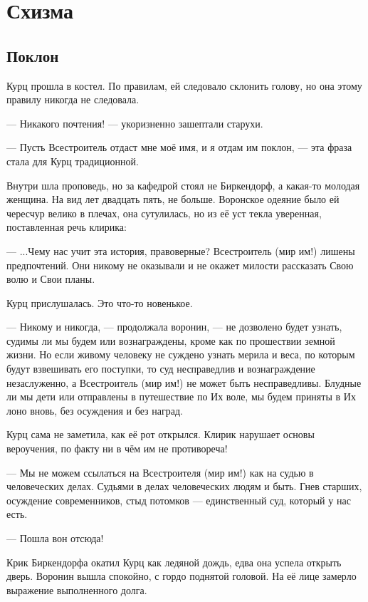 \chapter{Схизма}

\section{Поклон}

Курц прошла в костел.
По правилам, ей следовало склонить голову, но она этому правилу никогда не следовала.

--- Никакого почтения! --- укоризненно зашептали старухи.

--- Пусть Всестроитель отдаст мне моё имя, и я отдам им поклон, --- эта фраза стала для Курц традиционной.

Внутри шла проповедь, но за кафедрой стоял не Биркендорф, а какая-то молодая женщина.
На вид лет двадцать пять, не больше.
Воронское одеяние было ей чересчур велико в плечах, она сутулилась, но из её уст текла уверенная, поставленная речь клирика:

--- ...Чему нас учит эта история, правоверные?
Всестроитель (мир им!) лишены предпочтений.
Они никому не оказывали и не окажет милости рассказать Свою волю и Свои планы.

Курц прислушалась.
Это что-то новенькое.

--- Никому и никогда, --- продолжала воронин, --- не дозволено будет узнать, судимы ли мы будем или вознаграждены, кроме как по прошествии земной жизни.
Но если живому человеку не суждено узнать мерила и веса, по которым будут взвешивать его поступки, то суд несправедлив и вознаграждение незаслуженно, а Всестроитель (мир им!) не может быть несправедливы.
Блудные ли мы дети или отправлены в путешествие по Их воле, мы будем приняты в Их лоно вновь, без осуждения и без наград.

Курц сама не заметила, как её рот открылся.
Клирик нарушает основы вероучения, по факту ни в чём им не противореча!

--- Мы не можем ссылаться на Всестроителя (мир им!) как на судью в человеческих делах.
Судьями в делах человеческих людям и быть.
Гнев старших, осуждение современников, стыд потомков --- единственный суд, который у нас есть.

\asterism

--- Пошла вон отсюда!

Крик Биркендорфа окатил Курц как ледяной дождь, едва она успела открыть дверь.
Воронин вышла спокойно, с гордо поднятой головой.
На её лице замерло выражение выполненного долга.

